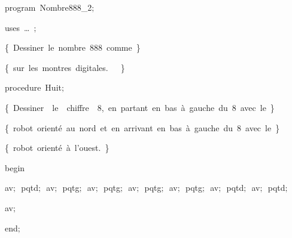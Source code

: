 
{
\parindent {}
\medskip

\carrenoir
\vspace{\neglskip}\mbox{\blc  \idt  \mcl program\idt \ Nombre888\_2$;$
}\par 
\vspace{\neglskip}\mbox{\blc \blk\idt \mcl uses\idt \ \ldots\ $;$
}\par 
\medskip

\vspace{\neglskip}\mbox{\blc  \idt  \cmt  \{\ Dessiner\ le\ nombre\ 888\ comme\ \}\idt }\par 
\vspace{\neglskip}\mbox{\blc  \idt  \cmt  \{\ sur\ les\ montres\ digitales.\ \ \ \}\idt }\par 
\medskip

\pagebreak[3] 
\vspace{\neglskip}\mbox{\blc  \blk\idt  \mcl procedure\idt \ Huit$;$}\par 
\vspace{\neglskip}\mbox{\blc  \blk\blk\idt  \cmt  \{\ Dessiner\ \ le\ \ chiffre\ \ 8,\ en\ partant\ en\ bas\ à\ gauche\ du\ 8\ avec\ le\ \}\idt }\par 
\vspace{\neglskip}\mbox{\blc  \blk\blk\idt  \cmt  \{\ robot\ orienté\ au\ nord\ et\ en\ arrivant\ en\ bas\ à\ gauche\ du\ 8\ avec\ le\ \}\idt }\par 
\vspace{\neglskip}\mbox{\blc  \blk\blk\idt  \cmt  \{\ robot\ orienté\ à\ l{'}ouest.\ \}\idt }\par 
\vspace{\neglskip}\mbox{\blc  \blk\idt  \mcl begin\idt }\par 
\vspace{\neglskip}\mbox{\blc  \blk\blk\idt  av$;$\ pqtd$;$\ av$;$\ pqtg$;$\ av$;$\ pqtg$;$\ av$;$\ pqtg$;$\ av$;$\ pqtg$;$\ av$;$\ pqtd$;$\ av$;$\ pqtd$;$}\par 
\vspace{\neglskip}\mbox{\blc  \blk\blk\idt  av$;$}\par 
\vspace{\neglskip}\mbox{\blc  \blk\idt  \mcl end\idt $;$}\par 
\medskip

}
